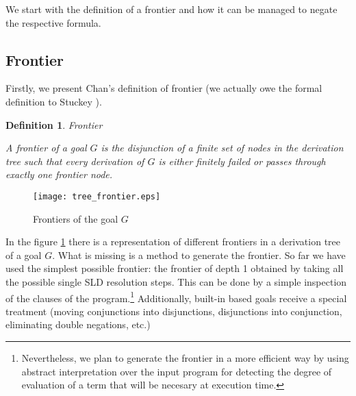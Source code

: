 \documentclass{tlp}
\newtheorem{definition}{Definition} %
\newcommand{\naf}{{\em naf}}\newcommand{\viejo}[1]{}
\begin{document}


We start with the definition of a frontier and how it can be managed
to negate the respective formula.

\vspace{-0.1in}

\subsection{Frontier}
\label{frontier}

Firstly, we present Chan's definition of frontier (we actually owe the formal
definition to Stuckey \cite{Stuckey95}).

\begin{definition}{\em Frontier}

A frontier of a goal $G$ is the disjunction of a finite set of nodes
in the derivation tree such that every derivation of $G$ is either
finitely failed or passes through exactly one {\em frontier node}.
\end{definition}

  \begin{figure}
        \centering
        \texttt{[image: tree\_frontier.eps]} 
        \caption{Frontiers of the goal $G$}
        \label{fig:tree_frontier}
  \end{figure}

In the figure \ref{fig:tree_frontier} there is a representation of different
frontiers in a derivation tree of a goal $G$. What is missing is a method to
generate the frontier. So far we have used the simplest possible frontier: the
frontier of depth 1 obtained by taking all the possible single SLD resolution
steps. This can be done by a simple inspection of the clauses of the
program.\footnote{Nevertheless, we plan to generate the frontier in a more
efficient way by using abstract interpretation over the input program for
detecting the degree of evaluation of a term that will be necesary at
execution time.} Additionally, built-in based goals receive a special
treatment (moving conjunctions into disjunctions, disjunctions into
conjunction, eliminating double negations, etc.)
\end{document}
